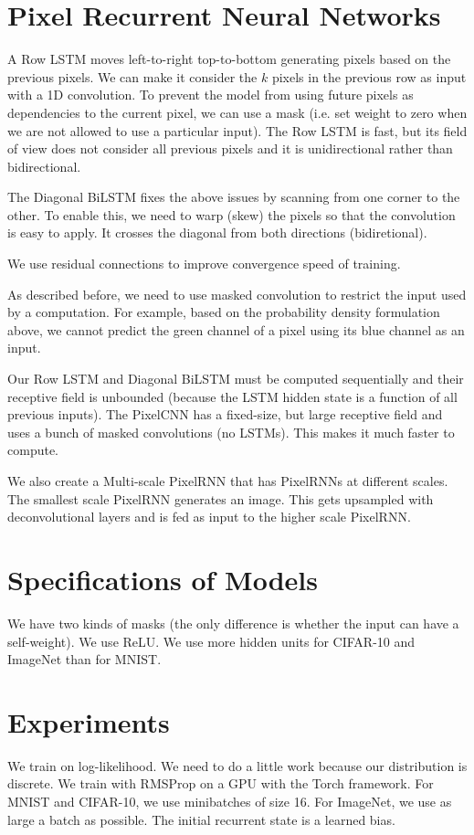 \documentclass[a4paper]{article}
\begin{document}
\section{Pixel Recurrent Neural Networks}
A Row LSTM moves left-to-right top-to-bottom generating pixels based on
the previous pixels. We can make it consider the $k$ pixels in the previous row
as input with a 1D convolution. To prevent the model from using future pixels
as dependencies to the current pixel, we can use a mask (i.e. set weight to
zero when we are not allowed to use a particular input). The Row LSTM is fast,
but its field of view does not consider all previous pixels and it is
unidirectional rather than bidirectional.

The Diagonal BiLSTM fixes the above issues by scanning from one corner to the
other. To enable this, we need to warp (skew) the pixels so that the convolution
is easy to apply. It crosses the diagonal from both directions (bidiretional).

We use residual connections to improve convergence speed of training.

As described before, we need to use masked convolution to restrict the input
used by a computation. For example, based on the probability density formulation
above, we cannot predict the green channel of a pixel using its blue channel as
an input.

Our Row LSTM and Diagonal BiLSTM must be computed sequentially and their
receptive field is unbounded (because the LSTM hidden state is a function of
all previous inputs). The PixelCNN has a fixed-size, but large receptive field
and uses a bunch of masked convolutions (no LSTMs). This makes it much faster
to compute.

We also create a Multi-scale PixelRNN that has PixelRNNs at different scales.
The smallest scale PixelRNN generates an image. This gets upsampled with
deconvolutional layers and is fed as input to the higher scale PixelRNN.

\section{Specifications of Models}
We have two kinds of masks (the only difference is whether the input can have
a self-weight). We use ReLU. We use more hidden units for CIFAR-10 and ImageNet
than for MNIST.

\section{Experiments}
We train on log-likelihood. We need to do a little work because our distribution
is discrete. We train with RMSProp on a GPU with the Torch framework. For MNIST
and CIFAR-10, we use minibatches of size 16. For ImageNet, we use as large a
batch as possible. The initial recurrent state is a learned bias.
\end{document}
